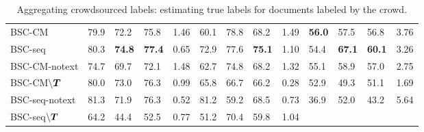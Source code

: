 \begin{table}
\begin{tabular}{l l l l r@{\hskip 0.8cm} l l l r@{\hskip 0.8cm} l l l r }
BSC-CM & 
79.9 & 72.2 & 75.8 & 1.46 & 
60.1 & 78.8 & 68.2 & 1.49 & 
\textbf{56.0} & 57.5 & 56.8 & %
3.76 
\\ 
BSC-seq & 
80.3 & \textbf{74.8} & \textbf{77.4} & 0.65 & 
72.9 & 77.6 & \textbf{75.1} & 1.10 & 
54.4 & \textbf{67.1} & \textbf{60.1} & %
 3.26
\\ \midrule
BSC-CM-notext & 
74.7 & 69.7 & 72.1 & 1.48 & 
62.7 & 74.8 & 68.2 & 1.32 & 
55.1 & 58.9 & 57.0 & 2.75
\\
BSC-CM$\backslash\boldsymbol T$ & 
80.0 & 73.0 & 76.3 & 0.99 &
65.8 & 66.7 & 66.2 & 0.28 &
52.9 & 49.3 & 51.1 & 1.69
 \\
BSC-seq-notext & 
81.3 & 71.9 & 76.3 & 0.52 & 
81.2 & 59.2 & 68.5 & 0.73 &
36.9 & 52.0 & 43.2 & 5.64 
\\ 
BSC-seq$\backslash\boldsymbol T$ & 
64.2 & 44.4 & 52.5 & 0.77 &
51.2 & 70.4 & 59.8 & 1.04 &

\\
\bottomrule 
\end{tabular}
\caption{Aggregating crowdsourced labels: estimating true labels for documents labeled by the crowd.}
\label{tab:aggregation_results}
\npnoround
\end{table}

